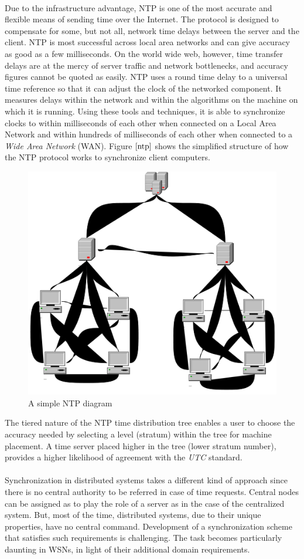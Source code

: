 \documentclass[a4paper,10pt]{report}
\begin{document}
\paragraph*{}
Due to the infrastructure advantage, NTP is one of the most accurate and flexible means of sending time over the Internet. The protocol is designed to compensate for some, but not all, network time delays between the server and the client. NTP is most successful across local area networks and can give accuracy as good as a few milliseconds. On the world wide web, however, time transfer delays are at the mercy of server traffic and network bottlenecks, and accuracy figures cannot be quoted as easily. NTP uses a round time delay to a universal time reference so that it can adjust the clock of the networked component. It measures delays within the network and within the algorithms on the machine on which it is running. Using  these tools and techniques, it is able to synchronize clocks to within milliseconds of each other when connected on a Local Area Network and within hundreds of milliseconds of each other when connected to a \textit{Wide Area Network} (WAN). Figure $\ref{ntp}$ shows the simplified structure of how the NTP protocol works to synchronize client computers.
\begin{figure}
\centering
\includegraphics[width= 0.4 \textwidth]{ntp}
\caption{A simple NTP diagram} \label{ntp}
\end{figure}
The tiered nature of the NTP time distribution tree enables a user to choose the accuracy needed by selecting a level (stratum) within
the tree for machine placement. A time server placed higher in the tree (lower stratum number), provides a higher likelihood of
agreement with the \textit{UTC} standard.
\paragraph*{}
Synchronization in distributed systems takes a different kind of approach since there is no central authority to be referred
in case of time requests. Central nodes can be assigned as to play the role of a server as in the case of the centralized system.
But, most of the time, distributed systems, due to their unique properties, have no central command. Development of a synchronization
scheme that satisfies such requirements is challenging. The task becomes particularly daunting in WSNs, in light of their additional
domain requirements.
\end{document}
